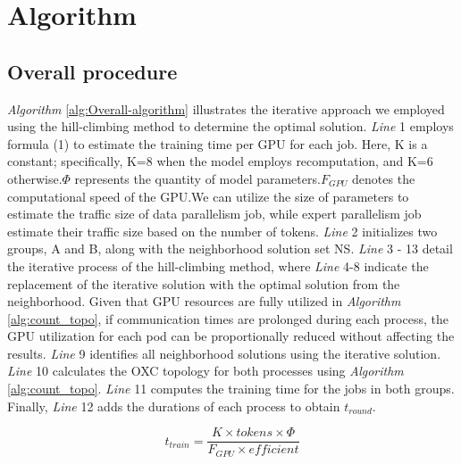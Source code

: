 \documentclass[conference]{IEEEtran}
\begin{document}
\section{Algorithm}
\subsection{Overall procedure}


\emph{Algorithm} \ref{alg:Overall-algorithm} illustrates the iterative approach we employed using the hill-climbing method to determine the optimal solution. \emph{Line} 1 employs formula (1) to estimate the training time per GPU for each job. Here, K is a constant; specifically, K=8 when the model employs recomputation, and K=6 otherwise.$\Phi$ represents the quantity of model parameters.$F_{GPU}$ denotes the computational speed of the GPU.We can utilize the size of parameters to estimate the traffic size of data parallelism job, while expert parallelism job estimate their traffic size based on the number of tokens. \emph{Line} 2 initializes two groups, A and B, along with the neighborhood solution set NS. \emph{Line} 3 - 13 detail the iterative process of the hill-climbing method, where \emph{Line} 4-8 indicate the replacement of the iterative solution with the optimal solution from the neighborhood. Given that GPU resources are fully utilized in \emph{Algorithm} \ref{alg:count_topo}, if communication times are prolonged during each process, the GPU utilization for each pod can be proportionally reduced without affecting the results. \emph{Line} 9 identifies all neighborhood solutions using the iterative solution. \emph{Line} 10 calculates the OXC topology for both processes using \emph{Algorithm} \ref{alg:count_topo}. \emph{Line} 11 computes the training time for the jobs in both groups. Finally, \emph{Line} 12 adds the durations of each process to obtain $t_{round}$.

\begin{equation}
	t_{train} = \dfrac{K \times tokens \times \Phi}{F_{GPU} \times efficient}
\end{equation}
\end{document}

